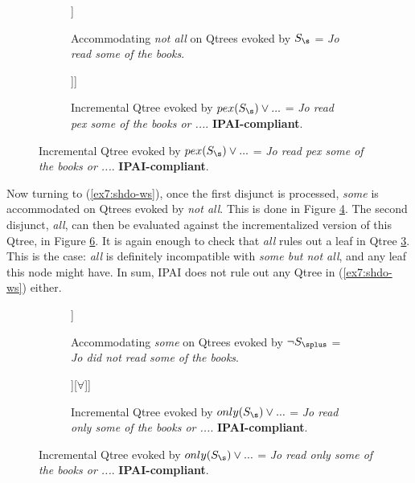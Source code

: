\begin{figure}[H]
	\centering
	\begin{subfigure}[b]{.45\linewidth}
		\centering
		\begin{forest}
			[CS$\cap\neg\forall$[$\neg\exists$][\fbox{$\exists\wedge\neg\forall$}]]
		\end{forest}
		\caption[]{Accommodating \textit{not all} on Qtrees evoked by $S_{\s}$ = \textit{Jo read some of the books}.}\label{fig7:qtree-some-inter-notall}
	\end{subfigure}
	\hfill
	\begin{subfigure}[b]{.45\linewidth}
		\centering
		\begin{forest}
			[CS$\cap\neg\forall$[$\neg\exists$][\fbox{$\exists\wedge\neg\forall$}[?,roof]]]
		\end{forest}
		\caption[]{Incremental Qtree evoked by $pex (S_{\s}) \vee ...$ = \textit{Jo read pex some of the books or ...}. \textbf{IPAI-compliant}. }\label{fig7:sqtree-some-inter-notall}
	\end{subfigure}
\end{figure}

Now turning to (\ref{ex7:shdo-ws}), once the first disjunct is processed, \textit{some} is  accommodated on Qtrees evoked by \textit{not all}. This is done in Figure \ref{fig7:qtree-notall-inter-some}. The second disjunct, \textit{all}, can then be evaluated against the incrementalized version of this Qtree, in Figure \ref{fig7:sqtree-notall-inter-some}. It is again enough to check that \textit{all} rules out a leaf in Qtree \ref{fig7:sqtree-some-inter-notall}. This is the case: \textit{all} is definitely incompatible with \textit{some but not all}, and any leaf this node might have. In sum, IPAI does not rule out any Qtree in (\ref{ex7:shdo-ws}) either.

\begin{figure}[H]
	\centering
	\begin{subfigure}[b]{.45\linewidth}
		\centering
		\begin{forest}
			[{CS$\cap\exists$}[\fbox{$\exists\wedge\neg\forall$}][{$\forall$}]]
		\end{forest}
		\caption[]{Accommodating \textit{some} on Qtrees evoked by $\neg S_{\splus}$ = \textit{Jo did not read some of the books}. }\label{fig7:qtree-notall-inter-some}
	\end{subfigure}
	\hfill
	\begin{subfigure}[b]{.45\linewidth}
		\centering
		\begin{forest}
			[{CS$\cap\exists$}[\fbox{$\exists\wedge\neg\forall$}[?,roof]][{$\forall$}]]
		\end{forest}
		\caption[]{Incremental Qtree evoked by $only (S_{\s}) \vee ...$ = \textit{Jo read only some of the books or ...}. \textbf{IPAI-compliant}. }\label{fig7:sqtree-notall-inter-some}
	\end{subfigure}
\end{figure}

